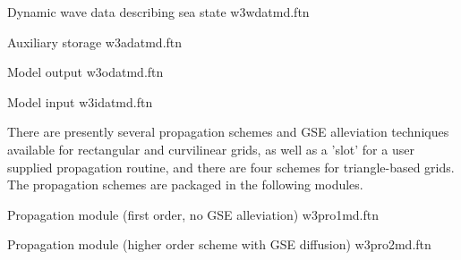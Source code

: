 \noindent
Dynamic wave data describing sea state \hfill {\file w3wdatmd.ftn}

\begin{flisti}
\end{flisti}

\noindent
Auxiliary storage \hfill {\file w3adatmd.ftn}

\begin{flisti}
\end{flisti}

\noindent
Model output \hfill {\file w3odatmd.ftn}

\begin{flisti}
\end{flisti}

\noindent
Model input \hfill {\file w3idatmd.ftn}

\begin{flisti}
\end{flisti}

\noindent
There are presently several propagation schemes and GSE alleviation techniques
available for rectangular and curvilinear grids, as well as a 'slot' for a
user supplied propagation routine, and there are four schemes for
triangle-based grids. The propagation schemes are packaged in the following
modules.

\vspace{\baselineskip} \noindent
Propagation module (first order, no GSE alleviation) \hfill {\file w3pro1md.ftn}

\begin{flisti}
\end{flisti}

\noindent
Propagation module (higher order scheme with GSE diffusion) \hfill {\file
  w3pro2md.ftn}

